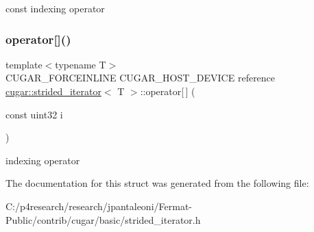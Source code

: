 const indexing operator \mbox{\label{structcugar_1_1strided__iterator_a136a837540ffa2511fc6923be7360071}} 
\subsubsection{\texorpdfstring{operator[]()}{operator[]()}\hspace{0.1cm}{\footnotesize\ttfamily [2/2]}}
{\footnotesize\ttfamily template$<$typename T$>$ \\
C\+U\+G\+A\+R\+\_\+\+F\+O\+R\+C\+E\+I\+N\+L\+I\+NE C\+U\+G\+A\+R\+\_\+\+H\+O\+S\+T\+\_\+\+D\+E\+V\+I\+CE reference \hyperlink{structcugar_1_1strided__iterator}{cugar\+::strided\+\_\+iterator}$<$ T $>$\+::operator\mbox{[}$\,$\mbox{]} (\begin{DoxyParamCaption}\item[{const uint32}]{i }\end{DoxyParamCaption})\hspace{0.3cm}{\ttfamily [inline]}}

indexing operator 

The documentation for this struct was generated from the following file\+:\begin{DoxyCompactItemize}
\item 
C\+:/p4research/research/jpantaleoni/\+Fermat-\/\+Public/contrib/cugar/basic/strided\+\_\+iterator.\+h\end{DoxyCompactItemize}
